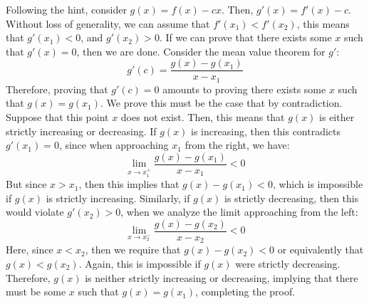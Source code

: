 \documentclass[10pt]{article}
\begin{document}
	\begin{solution}
		Following the hint, consider $g(x) = f(x) - cx$. Then, $g'(x) = f'(x) - c$. Without loss of generality, 
		we can assume that $f'(x_1) < f'(x_2)$, this means that $g'(x_1) < 0$, and $g'(x_2) > 0$. If we can 
		prove that there exists some $x$ such that $g'(x) = 0$, then we are done. Consider the mean value
		theorem for $g'$:
		\[
		g'(c) = \frac{g(x) - g(x_1)}{x - x_1}
		\] 
		Therefore, proving that $g'(c) = 0$ amounts to proving there exists some $x$ such that $g(x) = g(x_1)$. 
		We prove this must be the case that by contradiction. Suppose that this point $x$ does not exist. 
		Then, this means that $g(x)$ is either strictly increasing or decreasing. If $g(x)$ is increasing, then
		this contradicts $g'(x_1) = 0$, since when approaching $x_1$ from the right, we have:
		\[
			\lim_{x \to x_1^+} \frac{g(x) - g(x_1)}{x - x_1} < 0
		\] 
		But since $x > x_1$, then this implies that $g(x) - g(x_1) < 0$, which is impossible if $g(x)$ is 
		strictly increasing. Similarly, if $g(x)$ is strictly decreasing, then this would violate $g'(x_2) > 0$,
		when we analyze the limit approaching from the left:
		\[
			\lim_{x \to x_2^-} \frac{g(x) - g(x_2)}{x - x_2} < 0
		\] 
		Here, since $x < x_2$, then we require that $g(x) - g(x_2) < 0$ or equivalently that $g(x) < g(x_2)$. 
		Again, this is impossible if $g(x)$ were strictly decreasing. Therefore, $g(x)$ is neither strictly 
		increasing or decreasing, implying that there must be some $x$ such that $g(x) = g(x_1)$, completing
		the proof. 
	\end{solution}
\end{document}
